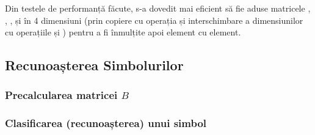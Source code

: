 \documentclass[12pt]{article}
\begin{document}
Din testele de performanță făcute, s-a dovedit mai eficient să fie
aduse matricele , , ,  și
 în 4 dimensiuni (prin copiere cu operația 
și interschimbare a dimensiunilor cu operațiile  și
) pentru a fi înmulțite apoi element cu element.



\subsection{Recunoașterea Simbolurilor}
\label{sec:symbol-recognition-sol}


\subsubsection{Precalcularea matricei $B$}
\label{sec:precomp-b-sol}



\subsubsection{Clasificarea (recunoașterea) unui simbol}
\label{sec:classify-sol}


\end{document}
